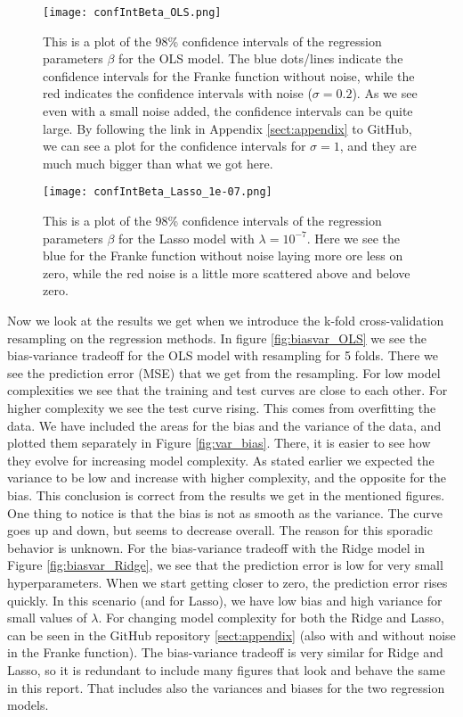 \documentclass[12pt,a4paper,english]{article}
\begin{document}
\begin{figure}[htbp]
	\centering\texttt{[image: confIntBeta\_OLS.png]}
	\caption{This is a plot of the 98\% confidence intervals of the regression parameters $\beta$ for the OLS model. The blue dots/lines indicate the confidence intervals for the Franke function without noise, while the red indicates the confidence intervals with noise ($\sigma=0.2$). As we see even with a small noise added, the confidence intervals can be quite large. By following the link in Appendix \ref{sect:appendix} to GitHub, we can see a plot for the confidence intervals for $\sigma=1$, and they are much much bigger than what we got here.\label{fig:conf_int_OLS}}
\end{figure} 

\begin{figure}[htbp]
	\centering\texttt{[image: confIntBeta\_Lasso\_1e-07.png]}
	\caption{This is a plot of the 98\% confidence intervals of the regression parameters $\beta$ for the Lasso model with $\lambda=10^{-7}$. Here we see the blue for the Franke function without noise laying more ore less on zero, while the red noise is a little more scattered above and belove zero.\label{fig:conf_int_Lasso}}
\end{figure} 

Now we look at the results we get when we introduce the k-fold cross-validation resampling on the regression methods. In figure \ref{fig:biasvar_OLS} we see the bias-variance tradeoff for the OLS model with resampling for 5 folds. There we see the prediction error (MSE) that we get from the resampling. For low model complexities we see that the training and test curves are close to each other. For higher complexity we see the test curve rising. This comes from overfitting the data. We have included the areas for the bias and the variance of the data, and plotted them separately in Figure \ref{fig:var_bias}. There, it is easier to see how they evolve for increasing model complexity. As stated earlier we expected the variance to be low and increase with higher complexity, and the opposite for the bias. This conclusion is correct from the results we get in the mentioned figures. One thing to notice is that the bias is not as smooth as the variance. The curve goes up and down, but seems to decrease overall. The reason for this sporadic behavior is unknown. For the bias-variance tradeoff with the Ridge model in Figure \ref{fig:biasvar_Ridge}, we see that the prediction error is low for very small hyperparameters. When we start getting closer to zero, the prediction error rises quickly. In this scenario (and for Lasso), we have low bias and high variance for small values of $\lambda$. For changing model complexity for both the Ridge and Lasso, can be seen in the GitHub repository \ref{sect:appendix} (also with and without noise in the Franke function). The bias-variance tradeoff is very similar for Ridge and Lasso, so it is redundant to include many figures that look  and behave the same in this report. That includes also the variances and biases for the two regression models.
\end{document}
